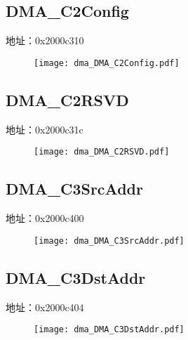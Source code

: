 \subsection{DMA\_C2Config}
\label{dma-DMA-C2Config}
地址：0x2000c310
 \begin{figure}[H]
\texttt{[image: dma\_DMA\_C2Config.pdf]}
\end{figure}

\subsection{DMA\_C2RSVD}
\label{dma-DMA-C2RSVD}
地址：0x2000c31c
 \begin{figure}[H]
\texttt{[image: dma\_DMA\_C2RSVD.pdf]}
\end{figure}

\subsection{DMA\_C3SrcAddr}
\label{dma-DMA-C3SrcAddr}
地址：0x2000c400
 \begin{figure}[H]
\texttt{[image: dma\_DMA\_C3SrcAddr.pdf]}
\end{figure}

\subsection{DMA\_C3DstAddr}
\label{dma-DMA-C3DstAddr}
地址：0x2000c404
 \begin{figure}[H]
\texttt{[image: dma\_DMA\_C3DstAddr.pdf]}
\end{figure}

